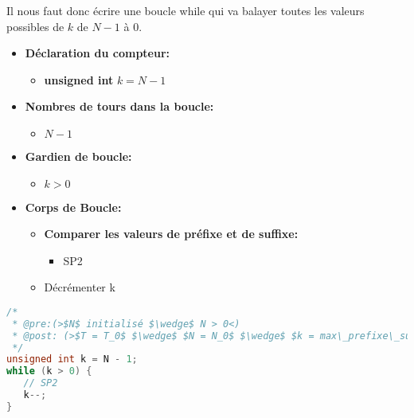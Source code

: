 \vspace{0.4cm}
Il nous faut donc écrire une boucle while qui va balayer toutes les valeurs
possibles de $k$ de $N-1$ à 0.
\begin{itemize}
   \item \textbf{Déclaration du compteur:}
      \begin{itemize}
         \item \textbf{unsigned int} $k = N-1$
      \end{itemize}
   \item \textbf{Nombres de tours dans la boucle:}
      \begin{itemize}
         \item $N-1$
      \end{itemize}
   \item \textbf{Gardien de boucle:}
      \begin{itemize}
         \item $k > 0$
      \end{itemize}
   \item \textbf{Corps de Boucle:}
   \begin{itemize}
      \item \textbf{Comparer les valeurs de préfixe et de suffixe:}
      \begin{itemize}
         \item SP2
      \end{itemize}
      \item Décrémenter k
   \end{itemize}
\end{itemize}

\begin{lstlisting}[language=C, caption=SP1]
/*
 * @pre:(>$N$ initialisé $\wedge$ N > 0<)
 * @post: (>$T = T_0$ $\wedge$ $N = N_0$ $\wedge$ $k = max\_prefixe\_suffixe(*T,k,N)$ $\wedge$ $k \geq 0$<)
 */
unsigned int k = N - 1;
while (k > 0) {
   // SP2
   k--;
}
\end{lstlisting}

